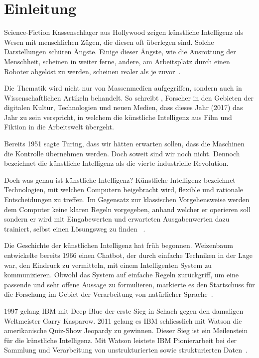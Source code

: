 \section{Einleitung}

Science-Fiction Kassenschlager aus Hollywood zeigen künstliche Intelligenz als Wesen mit menschlichen Zügen, die diesen oft überlegen sind. Solche Darstellungen schüren Ängste. Einige dieser Ängste, wie die Ausrottung der Menschheit, scheinen in weiter ferne, andere, am Arbeitsplatz durch einen Roboter abgelöst zu werden, scheinen realer als je zuvor~\autocite{Lu2018}.

Die Thematik wird nicht nur von Massenmedien aufgegriffen, sondern auch in Wissenschaftlichen Artikeln behandelt. So schreibt \textcite{Tredinnick2017}, Forscher in den Gebieten der digitalen Kultur, Technologien und neuen Medien, dass dieses Jahr (2017) das Jahr zu sein verspricht, in welchem die künstliche Intelligenz aus Film und Fiktion in die Arbeitswelt übergeht. 

Bereits 1951 sagte Turing, dass wir hätten erwarten sollen, dass die Maschinen die Kontrolle übernehmen werden. Doch soweit sind wir noch nicht. Dennoch bezeichnet \textcite{Tredinnick2017} die künstliche Intelligenz als die vierte industrielle Revolution.

Doch was genau ist künstliche Intelligenz? Künstliche Intelligenz bezeichnet Technologien, mit welchen Computern beigebracht wird, flexible und rationale Entscheidungen zu treffen. Im Gegensatz zur klassischen Vorgehensweise werden dem Computer keine klaren Regeln vorgegeben, anhand welcher er operieren soll sondern er wird mit Eingabewerten und erwarteten Ausgabenwerten dazu trainiert, selbst einen Lösungsweg zu finden ~\autocite{Tredinnick2017}.

Die Geschichte der künstlichen Intelligenz hat früh begonnen. Weizenbaum  entwickelte bereits 1966 einen Chatbot, der durch einfache Techniken in der Lage war, den Eindruck zu vermitteln, mit einem Intelligenten System zu kommunizieren. Obwohl das System auf einfache Regeln zurückgriff, um eine passende und sehr offene Aussage zu formulieren, markierte es den Startschuss für die Forschung im Gebiet der Verarbeitung von natürlicher Sprache~\autocite{Tredinnick2017}. 

1997 gelang IBM mit Deep Blue der erste Sieg in Schach gegen den damaligen Weltmeister Garry Kasparow. 2011 gelang es IBM schliesslich mit Watson die amerikanische Quiz-Show Jeopardy zu gewinnen. Dieser Sieg ist ein Meilenstein für die künstliche Intelligenz. Mit Watson leistete IBM Pionierarbeit bei der Sammlung und Verarbeitung von unstrukturierten sowie strukturierten Daten~\autocite{Tredinnick2017}.


